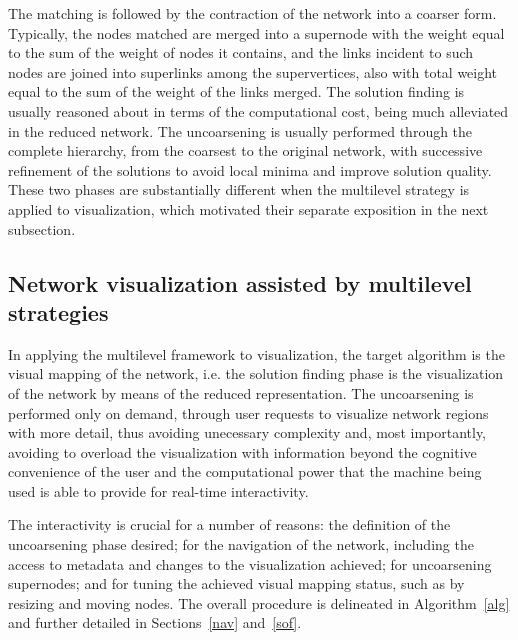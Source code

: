 \documentclass[runningheads]{llncs}
\begin{document}
The matching is followed by the contraction of the network into a coarser form.
Typically, the nodes matched are merged into a supernode
with the weight equal to the sum of the weight of nodes it contains,
and the links incident to such nodes are joined into superlinks among the supervertices,
also with total weight equal to the sum of the weight of the links merged.
The solution finding is usually reasoned about in terms of the computational cost, being much
alleviated in the reduced network.
The uncoarsening is usually performed through the complete hierarchy,
from the coarsest to the original network, with successive refinement of the solutions to
avoid local minima and improve solution quality.
These two phases are substantially different when the multilevel strategy is applied to visualization,
which motivated their separate exposition in the next subsection.

\subsection{Network visualization assisted by multilevel strategies}\label{net}
In applying the multilevel framework to visualization,
the target algorithm is the visual mapping of the network,
i.e. the solution finding phase is the visualization of the network by means of
the reduced representation.
The uncoarsening is performed only on demand, through user requests
to visualize network regions with more detail, thus avoiding unecessary complexity and,
most importantly, avoiding to overload the visualization with information beyond the
cognitive convenience of the user and the computational power that the machine being used
is able to provide for real-time interactivity.

The interactivity is crucial for a number of reasons:
the definition of the uncoarsening phase desired;
for the navigation of the network,
including the access to metadata and changes to the visualization achieved;
for uncoarsening supernodes;
and for tuning the achieved visual mapping status, such as by resizing
and moving nodes.
The overall procedure is delineated in Algorithm~\ref{alg} and further
detailed in Sections~\ref{nav} and~\ref{sof}.
\end{document}
